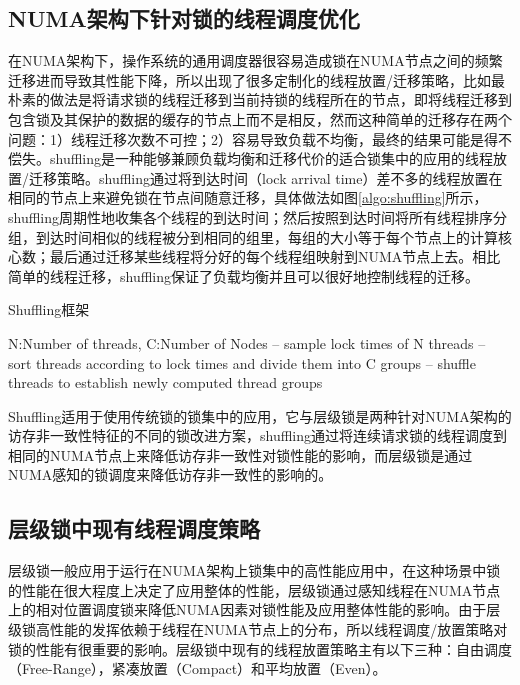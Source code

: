 \subsection{NUMA架构下针对锁的线程调度优化}
在NUMA架构下，操作系统的通用调度器很容易造成锁在NUMA节点之间的频繁迁移进而导致其性能下降，所以出现了很多定制化的线程放置/迁移策略，比如最朴素的做法是将请求锁的线程迁移到当前持锁的线程所在的节点\cite{sridharan2006thread}，即将线程迁移到包含锁及其保护的数据的缓存的节点上而不是相反，然而这种简单的迁移存在两个问题：1）线程迁移次数不可控；2）容易导致负载不均衡，最终的结果可能是得不偿失。shuffling\cite{pusukuri2014shuffling}是一种能够兼顾负载均衡和迁移代价的适合锁集中的应用的线程放置/迁移策略。shuffling通过将到达时间（lock arrival time）差不多的线程放置在相同的节点上来避免锁在节点间随意迁移，具体做法如图\ref{algo:shuffling}所示，shuffling周期性地收集各个线程的到达时间；然后按照到达时间将所有线程排序分组，到达时间相似的线程被分到相同的组里，每组的大小等于每个节点上的计算核心数；最后通过迁移某些线程将分好的每个线程组映射到NUMA节点上去。相比简单的线程迁移，shuffling保证了负载均衡并且可以很好地控制线程的迁移。

\begin{algorithm}
\caption{Shuffling框架}
\label{algo:shuffling}
\begin{algorithmic}[1] %
\Require N:Number of threads, C:Number of Nodes %
\Repeat
{} -- sample lock times of N threads
     -- sort threads according to lock times and divide them 
    into C groups
     -- shuffle threads to establish newly computed thread groups
\EndIf
{}
\end{algorithmic}
\end{algorithm}

Shuffling适用于使用传统锁的锁集中的应用，它与层级锁是两种针对NUMA架构的访存非一致性特征的不同的锁改进方案，shuffling通过将连续请求锁的线程调度到相同的NUMA节点上来降低访存非一致性对锁性能的影响，而层级锁是通过NUMA感知的锁调度来降低访存非一致性的影响的。

\subsection{层级锁中现有线程调度策略}
层级锁一般应用于运行在NUMA架构上锁集中的高性能应用中，在这种场景中锁的性能在很大程度上决定了应用整体的性能，层级锁通过感知线程在NUMA节点上的相对位置调度锁来降低NUMA因素对锁性能及应用整体性能的影响。由于层级锁高性能的发挥依赖于线程在NUMA节点上的分布，所以线程调度/放置策略对锁的性能有很重要的影响\cite{guiroux2016multicore}。层级锁中现有的线程放置策略主有以下三种：自由调度（Free-Range），紧凑放置（Compact）和平均放置（Even）。

